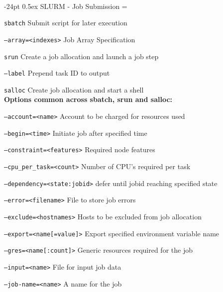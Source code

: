 \documentclass[8pt,portrait]{article}
\makeatletter
\renewcommand\section{\@startsection{section}{1}{0mm}%
                                     {-24pt}%
                                     {0.5ex}%
                                {\color{blue}\normalfont\large\bfseries}}
\newcommand{\code}{\texttt}
\newcommand{\describe}[1]{\begin{description}{#1}\end{description}}
\makeatother
\begin{document}
\begin{multicols*}{2}
\begin{tabular}{@{}l@{\ }l@{\ }l@{\ }l}
\end{tabular}\\





\section{SLURM - Job Submission}
\everypar={\hangindent=9mm}

\code{sbatch} Submit script for later execution
\describe{
\itemsep=0pt\parskip=0pt
    \item{\code{--array=<indexes>}} {Job Array Specification}
}

\code{srun} Create a job allocation and launch a job step
\describe{
\itemsep=0pt\parskip=0pt
 \item{\code{--label}} {Prepend task ID to output}
}

\code{salloc} Create job allocation and start a shell\\

\textbf{Options common across sbatch, srun and salloc:}
\describe{
\itemsep=0pt\parskip=0pt
    \item{\code{--account=<name>}} {Account to be charged for resources used}
    \item{\code{--begin=<time>}} {Initiate job after specified time}
    \item{\code{--constraint=<features>}} {Required node features}
    \item{\code{--cpu\_per\_task=<count>}} {Number of CPU's required per task}
    \item{\code{--dependency=<state:jobid>}} {defer until jobid reaching specified state}
    \item{\code{--error=<filename>}} {File to store job errors}
    \item{\code{--exclude=<hostnames>}} {Hosts to be excluded from job allocation}
    \item{\code{--export=<name[=value]>}} {Export specified environment variable name}
    \item{\code{--gres=<name[:count]>}} {Generic resources required for the job}
    \item{\code{--input=<name>}} {File for input job data}
    \item{\code{--job-name=<name>}} {A name for the job}
} 


\end{multicols*}
\end{document}
